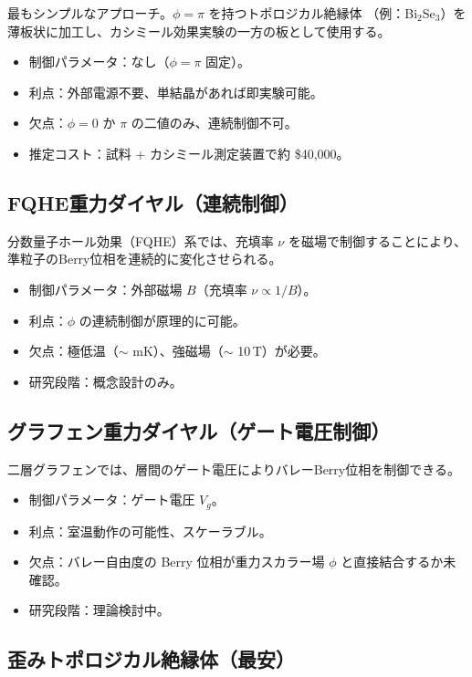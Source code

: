 最もシンプルなアプローチ。$\phi = \pi$ を持つトポロジカル絶縁体
（例：Bi$_2$Se$_3$）を薄板状に加工し、カシミール効果実験の一方の板として使用する。

\begin{itemize}
  \item 制御パラメータ：なし（$\phi = \pi$ 固定）。
  \item 利点：外部電源不要、単結晶があれば即実験可能。
  \item 欠点：$\phi = 0$ か $\pi$ の二値のみ、連続制御不可。
  \item 推定コスト：試料 + カシミール測定装置で約 \$40,000。
\end{itemize}

\subsection{FQHE重力ダイヤル（連続制御）}

分数量子ホール効果（FQHE）系では、充填率 $\nu$ を磁場で制御することにより、
準粒子のBerry位相を連続的に変化させられる。

\begin{itemize}
  \item 制御パラメータ：外部磁場 $B$（充填率 $\nu \propto 1/B$）。
  \item 利点：$\phi$ の連続制御が原理的に可能。
  \item 欠点：極低温（$\sim$ mK）、強磁場（$\sim$ 10\,T）が必要。
  \item 研究段階：概念設計のみ。
\end{itemize}

\subsection{グラフェン重力ダイヤル（ゲート電圧制御）}

二層グラフェンでは、層間のゲート電圧によりバレーBerry位相を制御できる。

\begin{itemize}
  \item 制御パラメータ：ゲート電圧 $V_g$。
  \item 利点：室温動作の可能性、スケーラブル。
  \item 欠点：バレー自由度の Berry 位相が重力スカラー場 $\phi$ と直接結合するか未確認。
  \item 研究段階：理論検討中。
\end{itemize}

\subsection{歪みトポロジカル絶縁体（最安）}

